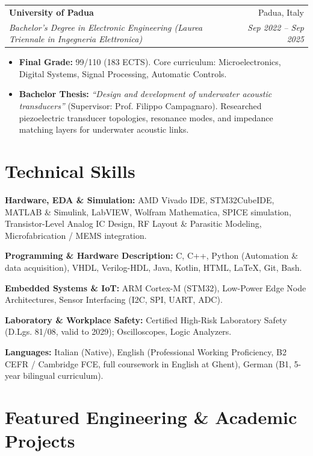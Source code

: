 \documentclass[10pt,a4paper]{article}
\makeatletter
\newcommand{\resumeItem}[1]{%
  \item\small{{#1}\vspace{-1.5pt}}%
}
\newcommand{\resumeSubheading}[4]{%
  \vspace{1pt}
  \noindent\begin{tabular*}{\textwidth}[t]{@{}l@{\extracolsep{\fill}}r@{}}
    \textbf{#1} & \textcolor{secondary}{\small #2} \\
    \textit{\small #3} & \textcolor{secondary}{\textit{\small #4}} \\
  \end{tabular*}\vspace{-3pt}
}
\newcommand{\resumeItemListStart}{\begin{itemize}[leftmargin=1.15em, itemsep=1.3pt, topsep=1pt, parsep=0pt]}
\newcommand{\resumeItemListEnd}{\end{itemize}\vspace{1.5pt}}
\makeatother
\begin{document}
\resumeSubheading
  {University of Padua}{Padua, Italy}
  {Bachelor's Degree in Electronic Engineering (Laurea Triennale in Ingegneria Elettronica)}{Sep 2022 -- Sep 2025}
  \resumeItemListStart
    \resumeItem{\textbf{Final Grade:} 99/110 (183 ECTS). Core curriculum: Microelectronics, Digital Systems, Signal Processing, Automatic Controls.}
    \resumeItem{\textbf{Bachelor Thesis:} \textit{``Design and development of underwater acoustic transducers''} (Supervisor: Prof. Filippo Campagnaro). Researched piezoelectric transducer topologies, resonance modes, and impedance matching layers for underwater acoustic links.}
  \resumeItemListEnd


\section{Technical Skills}
\begin{itemize}[leftmargin=1.15em, itemsep=1.3pt, topsep=1pt, parsep=0pt]
    \small{
    \item{\textbf{Hardware, EDA \& Simulation:} AMD Vivado IDE, STM32CubeIDE, MATLAB \& Simulink, LabVIEW, Wolfram Mathematica, SPICE simulation, Transistor-Level Analog IC Design, RF Layout \& Parasitic Modeling, Microfabrication / MEMS integration.}
    \item{\textbf{Programming \& Hardware Description:} C, C++, Python (Automation \& data acquisition), VHDL, Verilog-HDL, Java, Kotlin, HTML, LaTeX, Git, Bash.}
    \item{\textbf{Embedded Systems \& IoT:} ARM Cortex-M (STM32), Low-Power Edge Node Architectures, Sensor Interfacing (I2C, SPI, UART, ADC).}
    \item{\textbf{Laboratory \& Workplace Safety:} Certified High-Risk Laboratory Safety (D.Lgs. 81/08, valid to 2029); Oscilloscopes, Logic Analyzers.}
    \item{\textbf{Languages:} Italian (Native), English (Professional Working Proficiency, B2 CEFR / Cambridge FCE, full coursework in English at Ghent), German (B1, 5-year bilingual curriculum).}
    }
\end{itemize}

\section{Featured Engineering \& Academic Projects}
\end{document}

